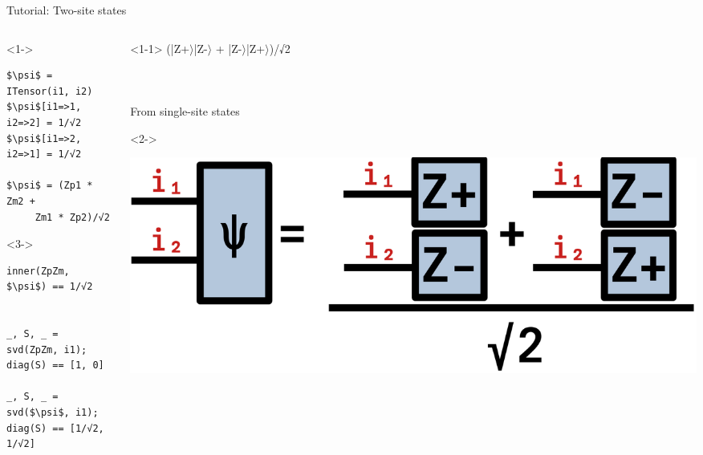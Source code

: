 \begin{frame}[fragile]{Tutorial: Two-site states}

\begin{columns}

\begin{column}{5cm}

\begin{onlyenv}<1->
\begin{lstlisting}[language=JuliaLocal, style=julia, mathescape, basicstyle=\scriptsize\ttfamily]
$\psi$ = ITensor(i1, i2)
$\psi$[i1=>1, i2=>2] = 1/√2
$\psi$[i1=>2, i2=>1] = 1/√2

$\psi$ = (Zp1 * Zm2 +
     Zm1 * Zp2)/√2
\end{lstlisting}
\end{onlyenv}

\begin{onlyenv}<3->
\begin{lstlisting}[language=JuliaLocal, style=julia, mathescape, basicstyle=\scriptsize\ttfamily]
inner(ZpZm, $\psi$) == 1/√2


_, S, _ = svd(ZpZm, i1);
diag(S) == [1, 0]

_, S, _ = svd($\psi$, i1);
diag(S) == [1/√2, 1/√2]
\end{lstlisting}
\end{onlyenv}

\end{column}

\begin{column}{5cm}

\begin{onlyenv}<1-1>
(|Z+$\rangle$|Z-$\rangle$ + |Z-$\rangle$|Z+$\rangle$)/√2 \\
~\\
~\\
~\\
From single-site states \\
\end{onlyenv}

\begin{onlyenv}<2->
\vspace*{0.0cm}
\begin{center}
\includegraphics[width=1.0\textwidth]{
  slides/assets/cat12.png
}
\end{center}
\vspace*{0.0cm}
\end{onlyenv}


\end{column}
\end{columns}
\end{frame}
